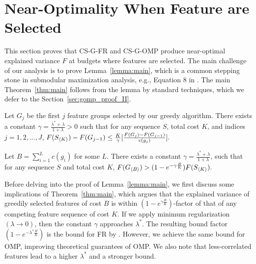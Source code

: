 \section{Near-Optimality When Feature are Selected}
\label{sec:gomp_proof}

This section proves that CS-G-FR and CS-G-OMP 
produce near-optimal explained variance $F$ at budgets 
where features are selected. The main challenge of our analysis is to prove Lemma~\ref{lemma:main},
which is a common stepping stone in 
submodular maximization analysis, e.g., Equation 8 in \citep{submodular}. The main Theorem~\ref{thm:main} follows from the lemma by standard techniques, which we defer to the Section~\ref{sec:gomp_proof_II}. 

\begin{lemma}[main]
  Let $G_j$ be the first $j$ feature groups selected by our greedy algorithm. There exists a constant $\gamma = \frac{\lambda^* + \lambda}{1 +\lambda} > 0$ such that for any sequence $S$, total cost $K$, and indices $j=1,2,..., J$, 
  \mbox{$
    F(S_{\langle K \rangle}) - F(G_{j-1}) \leq \frac{K}{\gamma}
      \lbrack \frac{F(G_j) - F(G_{j-1})}{c(g_j)} \rbrack.
  $}
  \label{lemma:main}
\end{lemma}


\begin{theorem}
Let $B = \sum _{i=1}^L c(g_i)$ for some $L$.  
There exists a constant  
  $\gamma = \frac{\lambda^* + \lambda}{1+\lambda}$, 
  such that
for any sequence $S$ and total cost $K$, 
\mbox{$
  F(G_{\langle B \rangle}) > (1 - e^{-\gamma\frac{B}{K}})F(S_{\langle K \rangle}).
$}
\label{thm:main}
\end{theorem}

%
Before delving into the proof of Lemma~\ref{lemma:main}, we first discuss 
some implications of Theorem~\ref{thm:main}, which 
argues that the explained variance of greedily selected
features of cost $B$ is within $(1-e^{\gamma \frac{B}{K}})$-factor
of that of any competing feature sequence of cost $K$.
If we apply minimum regularization $(\lambda \rightarrow 0)$, then 
the constant $\gamma$ approaches $\lambda^*$. The resulting bound factor $(1-e^{ - \lambda^* \frac{B}{K}})$ is the bound for FR by \cite{kemp}. However, we achieve the same bound for OMP, improving
theoretical guarantees of OMP. We also note that less-correlated features lead
to a higher $\lambda^*$  and a stronger bound. 


